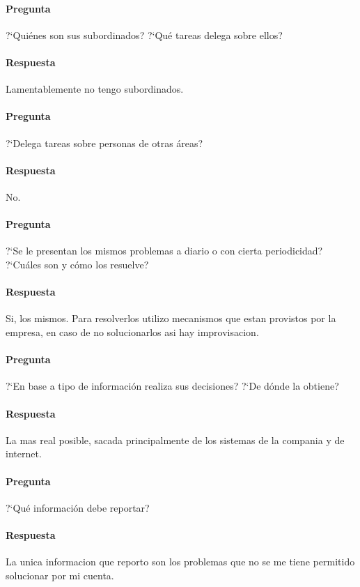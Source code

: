 \documentclass[12pt,a4paper,spanish]{article}
\begin{document}
	\paragraph{Pregunta}
	 ?`Qui\'enes son sus subordinados?  ?`Qu\'e tareas delega sobre ellos?
	\paragraph{Respuesta}
Lamentablemente no tengo subordinados.

	\paragraph{Pregunta}
	 ?`Delega tareas sobre personas de otras \'areas?
	\paragraph{Respuesta}
No.
	\paragraph{Pregunta}
	 ?`Se le presentan los mismos problemas a diario o con cierta periodicidad?  ?`Cu\'ales son y c\'omo los resuelve?
	\paragraph{Respuesta}
Si, los mismos. Para resolverlos utilizo mecanismos que estan provistos por la empresa, en caso de no solucionarlos asi hay improvisacion.

	\paragraph{Pregunta}
	 ?`En base a tipo de informaci\'on realiza sus decisiones?  ?`De d\'onde la obtiene?
	\paragraph{Respuesta}
	La mas real posible, sacada principalmente de los sistemas de la compania y de internet.

	\paragraph{Pregunta}
	 ?`Qu\'e informaci\'on debe reportar?
	\paragraph{Respuesta}
La unica informacion que reporto son los problemas que no se me tiene permitido solucionar por mi cuenta.
\end{document}
